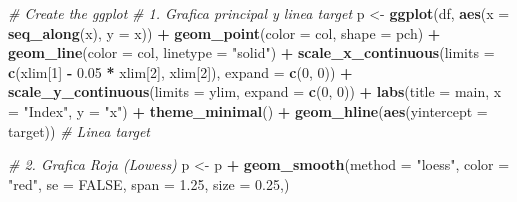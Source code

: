 \documentclass[
]{book}
\newenvironment{Shaded}{\begin{snugshade}}{\end{snugshade}}
\newcommand{\AttributeTok}[1]{\textcolor[rgb]{0.13,0.29,0.53}{#1}}
\newcommand{\CommentTok}[1]{\textcolor[rgb]{0.56,0.35,0.01}{\textit{#1}}}
\newcommand{\ConstantTok}[1]{\textcolor[rgb]{0.56,0.35,0.01}{#1}}
\newcommand{\DecValTok}[1]{\textcolor[rgb]{0.00,0.00,0.81}{#1}}
\newcommand{\FloatTok}[1]{\textcolor[rgb]{0.00,0.00,0.81}{#1}}
\newcommand{\FunctionTok}[1]{\textcolor[rgb]{0.13,0.29,0.53}{\textbf{#1}}}
\newcommand{\NormalTok}[1]{#1}
\newcommand{\OtherTok}[1]{\textcolor[rgb]{0.56,0.35,0.01}{#1}}
\newcommand{\SpecialCharTok}[1]{\textcolor[rgb]{0.81,0.36,0.00}{\textbf{#1}}}
\newcommand{\StringTok}[1]{\textcolor[rgb]{0.31,0.60,0.02}{#1}}
\begin{document}
\begin{Shaded}
\begin{Highlighting}[]
  \CommentTok{\# Create the ggplot}
  \CommentTok{\# 1. Grafica principal y linea target}
\NormalTok{  p }\OtherTok{\textless{}{-}} \FunctionTok{ggplot}\NormalTok{(df, }\FunctionTok{aes}\NormalTok{(}\AttributeTok{x =} \FunctionTok{seq\_along}\NormalTok{(x), }\AttributeTok{y =}\NormalTok{ x)) }\SpecialCharTok{+}
    \FunctionTok{geom\_point}\NormalTok{(}\AttributeTok{color =}\NormalTok{ col, }\AttributeTok{shape =}\NormalTok{ pch) }\SpecialCharTok{+}
    \FunctionTok{geom\_line}\NormalTok{(}\AttributeTok{color =}\NormalTok{ col, }\AttributeTok{linetype =} \StringTok{"solid"}\NormalTok{) }\SpecialCharTok{+}
    \FunctionTok{scale\_x\_continuous}\NormalTok{(}\AttributeTok{limits =} \FunctionTok{c}\NormalTok{(xlim[}\DecValTok{1}\NormalTok{] }\SpecialCharTok{{-}} \FloatTok{0.05} \SpecialCharTok{*}\NormalTok{ xlim[}\DecValTok{2}\NormalTok{], xlim[}\DecValTok{2}\NormalTok{]), }\AttributeTok{expand =} \FunctionTok{c}\NormalTok{(}\DecValTok{0}\NormalTok{, }\DecValTok{0}\NormalTok{)) }\SpecialCharTok{+}
    \FunctionTok{scale\_y\_continuous}\NormalTok{(}\AttributeTok{limits =}\NormalTok{ ylim, }\AttributeTok{expand =} \FunctionTok{c}\NormalTok{(}\DecValTok{0}\NormalTok{, }\DecValTok{0}\NormalTok{)) }\SpecialCharTok{+}
    \FunctionTok{labs}\NormalTok{(}\AttributeTok{title =}\NormalTok{ main, }\AttributeTok{x =} \StringTok{"Index"}\NormalTok{, }\AttributeTok{y =} \StringTok{"x"}\NormalTok{) }\SpecialCharTok{+}
    \FunctionTok{theme\_minimal}\NormalTok{() }\SpecialCharTok{+}
    \FunctionTok{geom\_hline}\NormalTok{(}\FunctionTok{aes}\NormalTok{(}\AttributeTok{yintercept =}\NormalTok{ target)) }\CommentTok{\# Linea target}
  
  \CommentTok{\# 2. Grafica Roja (Lowess)}
\NormalTok{  p }\OtherTok{\textless{}{-}}\NormalTok{ p }\SpecialCharTok{+} \FunctionTok{geom\_smooth}\NormalTok{(}\AttributeTok{method =} \StringTok{"loess"}\NormalTok{, }\AttributeTok{color =} \StringTok{"red"}\NormalTok{, }\AttributeTok{se =} \ConstantTok{FALSE}\NormalTok{, }\AttributeTok{span =} \FloatTok{1.25}\NormalTok{, }\AttributeTok{size =} \FloatTok{0.25}\NormalTok{,)}
  

\end{Highlighting}
\end{Shaded}
\end{document}
